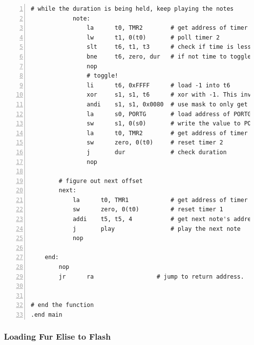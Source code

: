 \documentclass[11pt]{article}
\begin{document}
\begin{lstlisting}[numbers=left,basicstyle=\footnotesize]
            # while the duration is being held, keep playing the notes
            note:
                la      t0, TMR2        # get address of timer 2
                lw      t1, 0(t0)       # poll timer 2
                slt     t6, t1, t3      # check if time is less than the period
                bne     t6, zero, dur   # if not time to toggle speaker, check duration
                nop
                # toggle!
                li      t6, 0xFFFF      # load -1 into t6
                xor     s1, s1, t6      # xor with -1. This inverts all the bits
                andi    s1, s1, 0x0080  # use mask to only get RG7
                la      s0, PORTG       # load address of PORTG
                sw      s1, 0(s0)       # write the value to PORTG.
                la      t0, TMR2        # get address of timer 2
                sw      zero, 0(t0)     # reset timer 2
                j       dur             # check duration
                nop

        # figure out next offset
        next:
            la      t0, TMR1            # get address of timer 1
            sw      zero, 0(t0)         # reset timer 1
            addi    t5, t5, 4           # get next note's address
            j       play                # play the next note
            nop

    end:
        nop
        jr      ra                  # jump to return address.


# end the function
.end main
\end{lstlisting}

\subsubsection{Loading Fur Elise to Flash}
\end{document}
